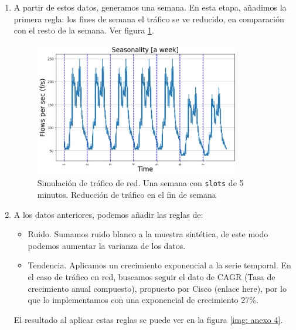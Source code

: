 \documentclass[a4paper, oneside, 12pt]{book}
\begin{document}
\begin{enumerate}
		\item A partir de estos datos, generamos una semana. En esta etapa, añadimos la primera regla: los fines de semana el tráfico se ve reducido, en comparación con el resto de la semana. Ver figura \ref{img: anexo 3}.
		
		\begin{figure}[h!]
			\includegraphics[width=0.85\textwidth, center]{img/anexo_3.png}
			\caption{Simulación de tráfico de red. Una semana con \texttt{slots} de 5 minutos. Reducción de tráfico en el fin de semana}
			\label{img: anexo 3}
		\end{figure}
	
		\pagebreak
		
		\item A los datos anteriores, podemos añadir las reglas de: 
		\begin{itemize}
			\item Ruido. Sumamos ruido blanco a la muestra sintética, de este modo podemos aumentar la varianza de los datos.
			
			\item Tendencia. Aplicamos un crecimiento exponencial a la serie temporal. En el caso de tráfico en red, buscamos seguir el dato de CAGR (Tasa de crecimiento anual compuesto), propuesto por Cisco (enlace here), por lo que lo implementamos con una exponencial de crecimiento 27\%.
			
		\end{itemize}
	
		\noindent El resultado al aplicar estas reglas se puede ver en la figura \ref{img: anexo 4}.
		

\end{enumerate}
\end{document}
